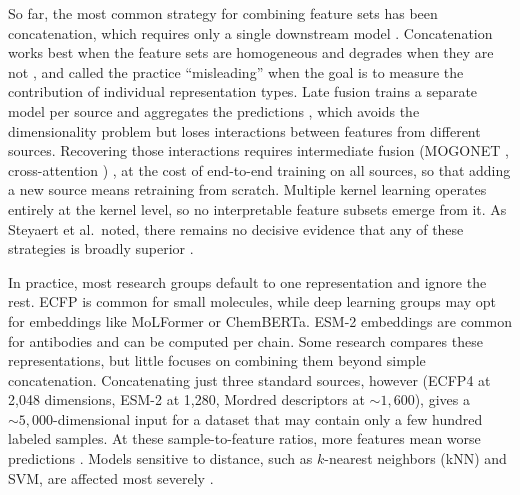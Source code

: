 So far, the most common strategy for combining feature sets has been concatenation, which requires only a single downstream model \citep{Stahlschmidt2022}. Concatenation works best when the feature sets are homogeneous and degrades when they are not \citep{Stahlschmidt2022}, and \citet{Deng2023} called the practice ``misleading'' when the goal is to measure the contribution of individual representation types. Late fusion trains a separate model per source and aggregates the predictions \citep{Steyaert2023}, which avoids the dimensionality problem but loses interactions between features from different sources. Recovering those interactions requires intermediate fusion (MOGONET \citep{Wang2021}, cross-attention \citep{Beaude2025}) %
, at the cost of end-to-end training on all sources, so that adding a new source means retraining from scratch. Multiple kernel learning \citep{Gonen2011} operates entirely at the kernel level, so no interpretable feature subsets emerge from it. As Steyaert et al.\ noted, there remains no decisive evidence that any of these strategies is broadly superior \citep{Steyaert2023}.

In practice, most research groups default to one representation and ignore the rest. ECFP is common for small molecules, while deep learning groups may opt for embeddings like MoLFormer or ChemBERTa. ESM-2 embeddings are common for antibodies and can be computed per chain. Some research compares these representations, but little focuses on combining them beyond simple concatenation. Concatenating just three standard sources, however (ECFP4 at 2,048 dimensions, ESM-2 at 1,280, Mordred descriptors at ${\sim}1{,}600$), gives a ${\sim}5{,}000$-dimensional input for a dataset that may contain only a few hundred labeled samples. At these sample-to-feature ratios, more features mean worse predictions \citep{Hughes1968, Bellman1961}. Models sensitive to distance, such as $k$-nearest neighbors (kNN) and SVM, are affected most severely \citep{FernandezDelgado2014}.

